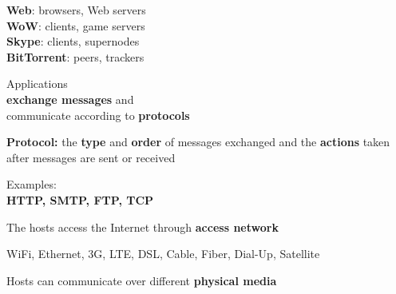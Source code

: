 \begin{frame}
\large
\textbf{Web}: browsers, Web servers\\
\textbf{WoW}: clients, game servers\\
\textbf{Skype}: clients, supernodes\\
\textbf{BitTorrent}: peers, trackers\\
\end{frame}

\begin{frame}
\begin{center}
\large
Applications\\\textbf{exchange messages} and\\ communicate according to \textbf{protocols}
\end{center}
\end{frame}

\begin{frame}
\begin{center}
\large
\textbf{Protocol:} the \textbf{type} and \textbf{order} of messages exchanged and the \textbf{actions} taken after messages are sent or received
\end{center}
\end{frame}

\begin{frame}
\begin{center}
\large
Examples:\\
\textbf{HTTP, SMTP, FTP, TCP}
\end{center}
\end{frame}

\begin{frame}
\begin{center}
\large
The hosts access the Internet through \textbf{access network}
\end{center}
\end{frame}

\begin{frame}\begin{center}
\large
WiFi, Ethernet, 3G, LTE, DSL, Cable, Fiber, Dial-Up, Satellite
\end{center}\end{frame}

\begin{frame}
\begin{center}
\large
Hosts can communicate over different \textbf{physical media}
\end{center}
\end{frame}

